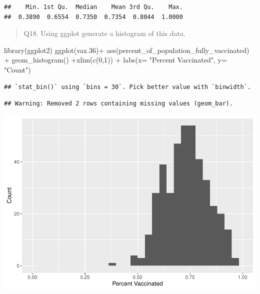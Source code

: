 \documentclass[
]{article}
\newenvironment{Shaded}{\begin{snugshade}}{\end{snugshade}}
\newcommand{\AttributeTok}[1]{\textcolor[rgb]{0.77,0.63,0.00}{#1}}
\newcommand{\DecValTok}[1]{\textcolor[rgb]{0.00,0.00,0.81}{#1}}
\newcommand{\FloatTok}[1]{\textcolor[rgb]{0.00,0.00,0.81}{#1}}
\newcommand{\FunctionTok}[1]{\textcolor[rgb]{0.00,0.00,0.00}{#1}}
\newcommand{\NormalTok}[1]{#1}
\newcommand{\SpecialCharTok}[1]{\textcolor[rgb]{0.00,0.00,0.00}{#1}}
\newcommand{\StringTok}[1]{\textcolor[rgb]{0.31,0.60,0.02}{#1}}
\begin{document}
\begin{Shaded}
\end{Shaded}

\begin{verbatim}
##    Min. 1st Qu.  Median    Mean 3rd Qu.    Max. 
##  0.3890  0.6554  0.7350  0.7354  0.8044  1.0000
\end{verbatim}

\begin{quote}
Q18. Using ggplot generate a histogram of this data.
\end{quote}

\begin{Shaded}
\begin{Highlighting}[]
\FunctionTok{library}\NormalTok{(ggplot2)}
\FunctionTok{ggplot}\NormalTok{(vax}\FloatTok{.36}\NormalTok{)}\SpecialCharTok{+} \FunctionTok{aes}\NormalTok{(percent\_of\_population\_fully\_vaccinated) }\SpecialCharTok{+} \FunctionTok{geom\_histogram}\NormalTok{() }\SpecialCharTok{+}\FunctionTok{xlim}\NormalTok{(}\FunctionTok{c}\NormalTok{(}\DecValTok{0}\NormalTok{,}\DecValTok{1}\NormalTok{)) }\SpecialCharTok{+} \FunctionTok{labs}\NormalTok{(}\AttributeTok{x=} \StringTok{"Percent Vaccinated"}\NormalTok{, }\AttributeTok{y=} \StringTok{"Count"}\NormalTok{)}
\end{Highlighting}
\end{Shaded}

\begin{verbatim}
## `stat_bin()` using `bins = 30`. Pick better value with `binwidth`.
\end{verbatim}

\begin{verbatim}
## Warning: Removed 2 rows containing missing values (geom_bar).
\end{verbatim}

\includegraphics{COVID19-Vax-mini-project_files/figure-latex/unnamed-chunk-34-1.pdf}
\end{document}
